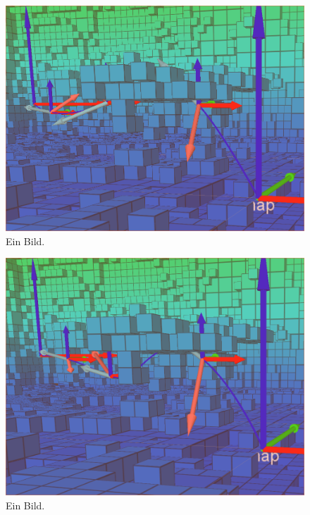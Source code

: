 \begin{figure}[h]
   \centering
   \includegraphics[width=1\textwidth]{pics/initialSolution.png}
   \caption{Ein Bild.}
\end{figure}


\begin{figure}[h]
   \centering
   \includegraphics[width=1\textwidth]{pics/Vertex_in_middle_2.png}
   \caption{Ein Bild.}
\end{figure}

